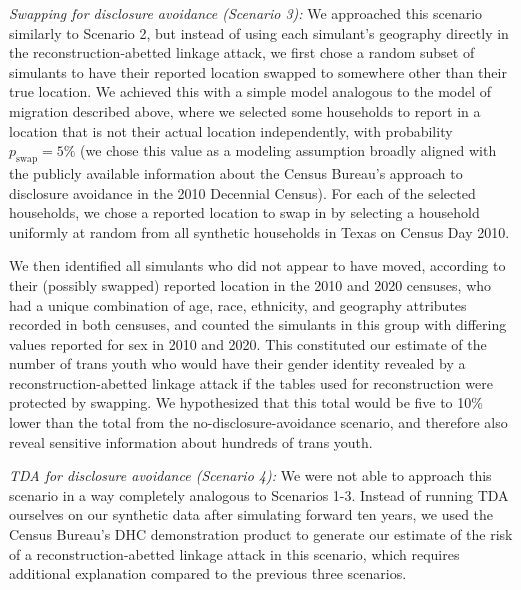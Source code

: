 \documentclass{jpc} %
\theoremstyle{plain}\newtheorem{satz}[thm]{Satz} %
\begin{document}
\emph{Swapping for disclosure avoidance (Scenario 3):} We approached this scenario similarly to Scenario 2, but instead of using each simulant's geography directly in the reconstruction-abetted linkage attack, we first chose a random subset of simulants to have their reported location swapped to somewhere other than their true location.  
We achieved this with a simple model analogous to the model of migration described above, where we selected some households to report in a location that is not their actual location independently, with probability $p_\text{swap} = 5\%$ (we chose this value as a modeling assumption broadly aligned with the  publicly available information about the Census Bureau's approach to disclosure avoidance in the 2010 Decennial Census).  For each of the selected households, we chose a reported location to swap in by selecting a household uniformly at random from all synthetic households in Texas on Census Day 2010.

We then identified all simulants who did not appear to have moved, according to their (possibly swapped) reported location in the 2010 and 2020 censuses, who had a unique combination of age, race, ethnicity, and geography attributes recorded in both censuses, and counted the simulants in this group with differing values reported for sex in 2010 and 2020.  This constituted our estimate of the number of trans youth who would have their gender identity revealed by a reconstruction-abetted linkage attack if the tables used for reconstruction were protected by swapping.  We hypothesized that this total would be five to 10\% lower than the total from the no-disclosure-avoidance scenario, and therefore also reveal sensitive information about hundreds of trans youth.

\emph{TDA for disclosure avoidance (Scenario 4):} We were not able to approach this scenario in a way completely analogous to Scenarios 1-3.  Instead of running TDA ourselves on our synthetic data after simulating forward ten years, we used the Census Bureau's DHC demonstration product to generate our estimate of the risk of a reconstruction-abetted linkage attack in this scenario, which requires additional explanation compared to the previous three scenarios.
\end{document}
